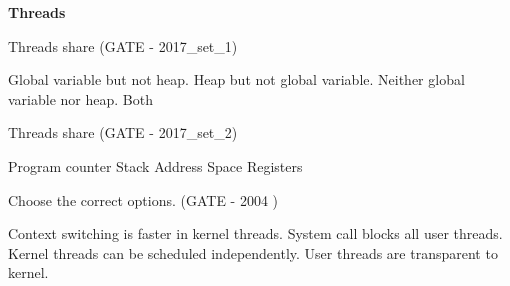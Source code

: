 \centerline{\textbf{ \LARGE Threads}}

\setcounter{question}{0}



\begin{minipage}{\linewidth}

  \question  Threads share (GATE - 2017\_set\_1)

  \begin{choices}
    \choice Global variable but not heap.
    \choice Heap but not global variable.
    \choice Neither global variable nor heap.
    \choice Both
  \end{choices}


  \end{minipage}

\vspace{0.08in}



\begin{minipage}{\linewidth}

  \question  Threads share (GATE - 2017\_set\_2)
    \begin{choices}
      \choice Program counter
      \choice Stack
      \choice Address Space
      \choice Registers
    \end{choices}


  \end{minipage}

\vspace{0.08in}



\begin{minipage}{\linewidth}

  \question Choose the correct options. (GATE - 2004 )

  \begin{choices}
    \choice Context switching is faster in kernel threads.
    \choice System call blocks all user threads.
    \choice Kernel threads can be scheduled independently.
    \choice User threads are transparent to kernel.
  \end{choices}


  \end{minipage}

\vspace{0.08in}




